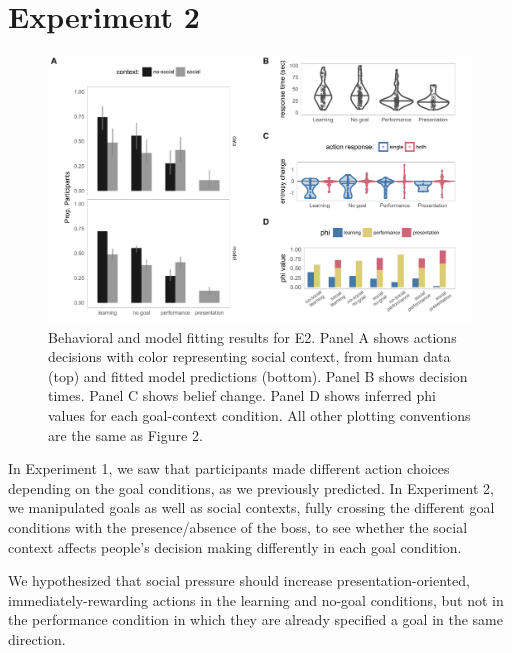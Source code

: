 \documentclass[10pt, letterpaper]{article}
\newenvironment{CodeChunk}{}{}
\begin{document}
\section{Experiment 2}\label{experiment-2}

\begin{CodeChunk}
\begin{figure}[tb]

{\centering \includegraphics[width=0.95\linewidth]{figs/e2_results-1} 

}

\caption[Behavioral and model fitting results for E2]{Behavioral and model fitting results for E2. Panel A shows actions decisions with color representing social context, from human data (top) and fitted model predictions (bottom). Panel B shows decision times. Panel C shows belief change. Panel D shows inferred phi values for each goal-context condition. All other plotting conventions are the same as Figure 2.}\label{fig:e2_results}
\end{figure}
\end{CodeChunk}

In Experiment 1, we saw that participants made different action choices
depending on the goal conditions, as we previously predicted. In
Experiment 2, we manipulated goals as well as social contexts, fully
crossing the different goal conditions with the presence/absence of the
boss, to see whether the social context affects people's decision making
differently in each goal condition.

We hypothesized that social pressure should increase
presentation-oriented, immediately-rewarding actions in the learning and
no-goal conditions, but not in the performance condition in which they
are already specified a goal in the same direction.
\end{document}
